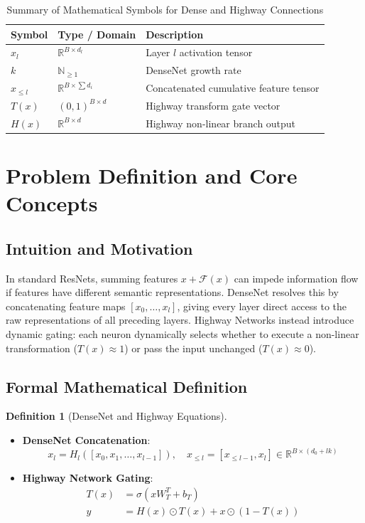 \documentclass[11pt,a4paper]{article}
\theoremstyle{definition}
\newtheorem{definition}{Definition}[section]
\begin{document}
\begin{table}[h]
\centering
\caption{Summary of Mathematical Symbols for Dense and Highway Connections}
\begin{tabular}{lll}
\toprule
\textbf{Symbol} & \textbf{Type / Domain} & \textbf{Description} \\
\midrule
$x_l$ & $\mathbb{R}^{B \times d_l}$ & Layer $l$ activation tensor \\
$k$ & $\mathbb{N}_{\ge 1}$ & DenseNet growth rate \\
$x_{\le l}$ & $\mathbb{R}^{B \times \sum d_i}$ & Concatenated cumulative feature tensor \\
$T(x)$ & $(0, 1)^{B \times d}$ & Highway transform gate vector \\
$H(x)$ & $\mathbb{R}^{B \times d}$ & Highway non-linear branch output \\
\bottomrule
\end{tabular}
\end{table}

\section{Problem Definition and Core Concepts}

\subsection{Intuition and Motivation}
In standard ResNets, summing features $x + \mathcal{F}(x)$ can impede information flow if features have different semantic representations. DenseNet resolves this by concatenating feature maps $[x_0, \dots, x_l]$, giving every layer direct access to the raw representations of all preceding layers. Highway Networks instead introduce dynamic gating: each neuron dynamically selects whether to execute a non-linear transformation ($T(x) \approx 1$) or pass the input unchanged ($T(x) \approx 0$).

\subsection{Formal Mathematical Definition}
\begin{definition}[DenseNet and Highway Equations]
\begin{itemize}
    \item \textbf{DenseNet Concatenation}:
    \begin{equation}
    x_l = H_l\left([x_0, x_1, \dots, x_{l-1}]\right), \quad x_{\le l} = [x_{\le l-1}, x_l] \in \mathbb{R}^{B \times (d_0 + l k)} \label{eq:densenet_eq}
    \end{equation}
    \item \textbf{Highway Network Gating}:
    \begin{align}
    T(x) &= \sigma\left(x W_T^T + b_T\right) \label{eq:highway_t} \\
    y &= H(x) \odot T(x) + x \odot (1 - T(x)) \label{eq:highway_y}
    \end{align}
\end{itemize}
\end{definition}
\end{document}
